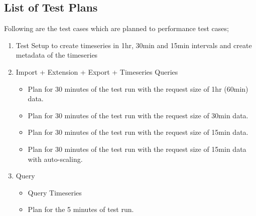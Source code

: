 \subsection{List of Test Plans}
\label{subse:test_plan_flow}
Following are the test cases which are planned to performance test cases;
\begin{enumerate}
    \item Test Setup to create timeseries in 1hr, 30min and 15min intervals and create metadata of the timeseries
    \item Import + Extension + Export + Timeseries Queries
    \begin{itemize}
        \item Plan for 30 minutes of the test run with the request size of 1hr (60min) data.
        \item Plan for 30 minutes of the test run with the request size of 30min data.
        \item Plan for 30 minutes of the test run with the request size of 15min data.
        \item Plan for 30 minutes of the test run with the request size of 15min data with auto-scaling.
    \end{itemize}
    \item Query
    \begin{itemize}
        \item Query Timeseries
        \item Plan for the 5 minutes of test run.
    \end{itemize}
\end{enumerate}


